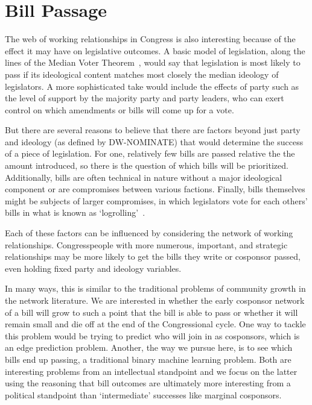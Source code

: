 \section{Bill Passage}
 
The web of working relationships in Congress is also interesting because of the effect it may have on legislative outcomes. A basic model of legislation, along the lines of the Median Voter Theorem~\cite{Black}, would say that legislation is most likely to pass if its ideological content matches most closely the median ideology of legislators. A more sophisticated take would include the effects of party such as the level of support by the majority party and party leaders, who can exert control on which amendments or bills will come up for a vote.
 
But there are several reasons to believe that there are factors beyond just party and ideology (as defined by DW-NOMINATE) that would determine the success of a piece of legislation. For one, relatively few bills are passed relative the the amount introduced, so there is the question of which bills will be prioritized. Additionally, bills are often technical in nature without a major ideological component or are compromises between various factions. Finally, bills themselves might be subjects of larger compromises, in which legislators vote for each others' bills in what is known as `logrolling'~\cite{Schwartz}.
 
Each of these factors can be influenced by considering the network of working relationships. Congresspeople with more numerous, important, and strategic relationships may be more likely to get the bills they write or cosponsor passed, even holding fixed party and ideology variables.
 
In many ways, this is similar to the traditional problems of community growth in the network literature. We are interested in whether the early cosponsor network of a bill will grow to such a point that the bill is able to pass or whether it will remain small and die off at the end of the Congressional cycle. One way to tackle this problem would be trying to predict who will join in as cosponsors, which is an edge prediction problem. Another, the way we pursue here, is to see which bills end up passing, a traditional binary machine learning problem. Both are interesting problems from an intellectual standpoint and we focus on the latter using the reasoning that bill outcomes are ultimately more interesting from a political standpoint than `intermediate' successes like marginal cosponsors.
 
